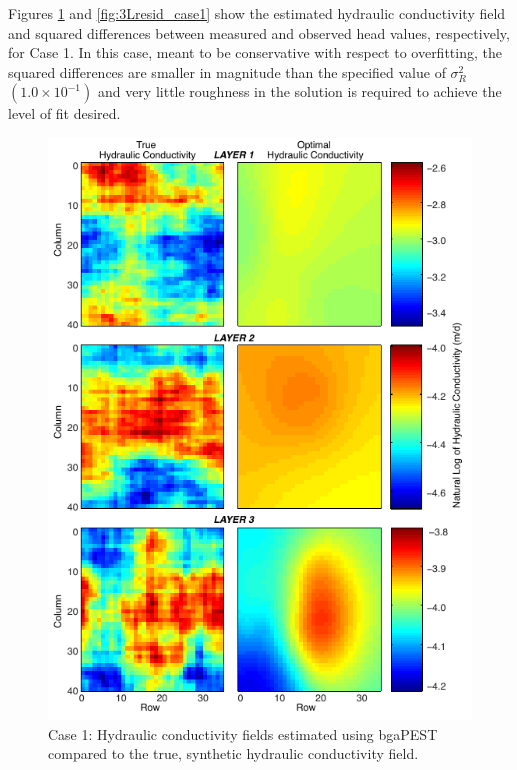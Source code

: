 \documentclass[11pt,oneside,onecolumn]{usgsreport}
\begin{document}
\begin{appendix}
\begin{table}[H]
\end{table}


Figures \ref{fig:3LK_case1} and \ref{fig:3Lresid_case1} show the
estimated hydraulic conductivity field and squared differences between
measured and observed head values, respectively, for Case 1. In this
case, meant to be conservative with respect to overfitting, the squared
differences are smaller in magnitude than the specified value of $\sigma_{R}^{2}$
$\left(1.0\times10^{-1}\right)$ and very little roughness in the
solution is required to achieve the level of fit desired.

\clearpage

\begin{figure}[H]
\begin{center}\includegraphics{figures/3KL_case1}\end{center}

\caption{\label{fig:3LK_case1}Case 1: Hydraulic conductivity fields estimated
using bgaPEST compared to the true, synthetic hydraulic conductivity
field.}
\end{figure}



\end{appendix}
\end{document}
